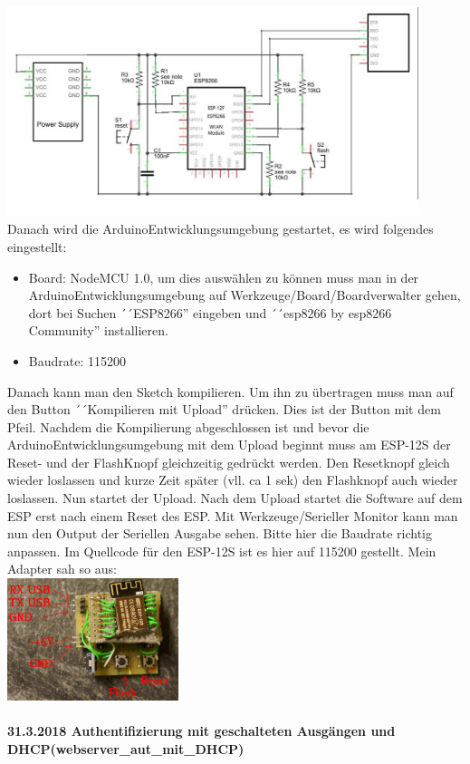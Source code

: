 \documentclass[11pt,fleqn]{book} %
\numberwithin{equation}{section} %
\numberwithin{figure}{section} %
\numberwithin{table}{section} %
\begin{document}
\includegraphics[width=12cm]{Pictures/espwiring.jpg}\\
Danach wird die ArduinoEntwicklungsumgebung gestartet, es wird folgendes eingestellt:
\begin{itemize}
 \item Board: NodeMCU 1.0, um dies auswählen zu können muss man in der ArduinoEntwicklungsumgebung auf Werkzeuge/Board/Boardverwalter gehen, dort bei Suchen ´´ESP8266'' eingeben und ´´esp8266 by esp8266 Community'' installieren.
 \item Baudrate: 115200
\end{itemize}
Danach kann man den Sketch kompilieren. Um ihn zu übertragen muss man auf den Button ´´Kompilieren mit Upload'' drücken. Dies ist der Button mit dem Pfeil. Nachdem die Kompilierung abgeschlossen ist und bevor die ArduinoEntwicklungsumgebung mit dem Upload beginnt muss am ESP-12S der Reset- und der FlashKnopf gleichzeitig gedrückt werden. Den Resetknopf gleich wieder loslassen und kurze Zeit später (vll. ca 1 sek) den Flashknopf auch wieder loslassen. Nun startet der Upload. Nach dem Upload startet die Software auf dem ESP erst nach einem Reset des ESP. Mit Werkzeuge/Serieller Monitor kann man nun den Output der Seriellen Ausgabe sehen. Bitte hier die Baudrate richtig anpassen. Im Quellcode für den ESP-12S ist es hier auf 115200 gestellt. Mein Adapter sah so aus:\\
\includegraphics[width=5cm]{Pictures/DSC01318.jpg}\\ \\
\textbf{\color{red}31.3.2018 Authentifizierung mit geschalteten Ausgängen und DHCP(webserver\_aut\_mit\_DHCP)\color{black}}\\
\end{document}
